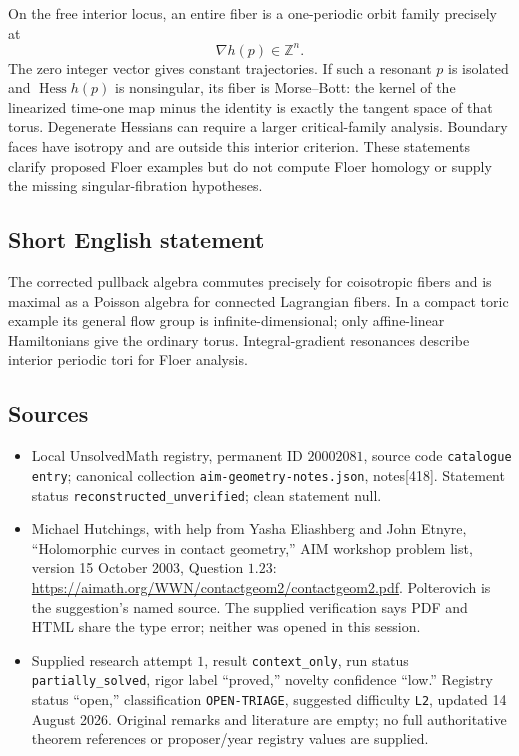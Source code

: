 \documentclass[11pt]{article}
\newcommand{\Z}{\mathbb{Z}}
\begin{document}
On the free interior locus, an entire fiber is a one-periodic orbit family precisely at
\[
 \nabla h(p)\in\Z^n.
\]
The zero integer vector gives constant trajectories. If such a resonant \(p\) is isolated and \(\operatorname{Hess}h(p)\) is nonsingular, its fiber is Morse--Bott: the kernel of the linearized time-one map minus the identity is exactly the tangent space of that torus. Degenerate Hessians can require a larger critical-family analysis. Boundary faces have isotropy and are outside this interior criterion. These statements clarify proposed Floer examples but do not compute Floer homology or supply the missing singular-fibration hypotheses.
\subsection{Short English statement}
The corrected pullback algebra commutes precisely for coisotropic fibers and is maximal as a Poisson algebra for connected Lagrangian fibers. In a compact toric example its general flow group is infinite-dimensional; only affine-linear Hamiltonians give the ordinary torus. Integral-gradient resonances describe interior periodic tori for Floer analysis.
\subsection{Sources}
\begin{itemize}
\item Local UnsolvedMath registry, permanent ID \(20002081\), source code \texttt{catalogue entry}; canonical collection \texttt{aim-geometry-notes.json}, notes[418]. Statement status \texttt{reconstructed\_unverified}; clean statement null.
\item Michael Hutchings, with help from Yasha Eliashberg and John Etnyre, ``Holomorphic curves in contact geometry,'' AIM workshop problem list, version 15 October 2003, Question \(1.23\): \url{https://aimath.org/WWN/contactgeom2/contactgeom2.pdf}. Polterovich is the suggestion's named source. The supplied verification says PDF and HTML share the type error; neither was opened in this session.
\item Supplied research attempt \(1\), result \texttt{context\_only}, run status \texttt{partially\_solved}, rigor label ``proved,'' novelty confidence ``low.'' Registry status ``open,'' classification \texttt{OPEN-TRIAGE}, suggested difficulty \texttt{L2}, updated 14 August 2026. Original remarks and literature are empty; no full authoritative theorem references or proposer/year registry values are supplied.
\end{itemize}
\end{document}
